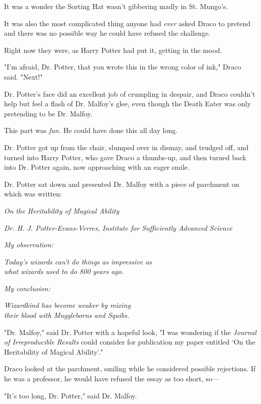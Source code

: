 It was a wonder the Sorting Hat wasn't gibbering madly in St. Mungo's.

It was also the most complicated thing anyone had \emph{ever} asked Draco to 
pretend and there was no possible way he could have refused the challenge.

Right now they were, as Harry Potter had put it, getting in the mood.

"I'm afraid, Dr. Potter, that you wrote this in the wrong color of ink," Draco 
said. "Next!"

Dr. Potter's face did an excellent job of crumpling in despair, and Draco 
couldn't help but feel a flash of Dr. Malfoy's glee, even though the Death 
Eater was only pretending to be Dr. Malfoy.

This part was \emph{fun.} He could have done this all day long.

Dr. Potter got up from the chair, slumped over in dismay, and trudged off, and 
turned into Harry Potter, who gave Draco a thumbs-up, and then turned back into 
Dr. Potter again, now approaching with an eager smile.

Dr. Potter sat down and presented Dr. Malfoy with a piece of parchment on which 
was written:

\begin{center}
\emph{On the Heritability of Magical Ability}

\emph{Dr. H. J. Potter-Evans-Verres, Institute for Sufficiently Advanced 
Science}
\end{center}

\emph{My observation:}

\emph{Today's wizards can't do things as impressive as\\
what wizards used to do 800 years ago.}

\emph{My conclusion:}

\emph{Wizardkind has become weaker by mixing\\
their blood with Muggleborns and Squibs.}

"Dr. Malfoy," said Dr. Potter with a hopeful look, "I was wondering if the 
\emph{Journal of Irreproducible Results} could consider for publication my 
paper entitled `On the Heritability of Magical Ability'."

Draco looked at the parchment, smiling while he considered possible rejections. 
If he was a professor, he would have refused the essay as too short, so---

"It's too long, Dr. Potter," said Dr. Malfoy.

